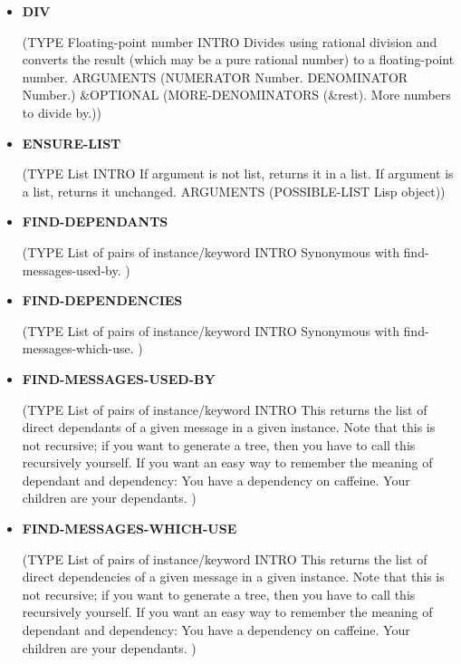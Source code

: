 \documentclass [11pt]{book}
\begin{document}
\begin{itemize}
\item {}
\label{prim:div}
\textbf{DIV}

(TYPE Floating-point number INTRO  Divides using rational division and converts the result (which may be a pure rational number)
to a floating-point number.
 ARGUMENTS (NUMERATOR Number. DENOMINATOR Number.) \&OPTIONAL (MORE-DENOMINATORS (\&rest). More numbers to divide by.))



\item {}
\label{prim:ensure-list}
\textbf{ENSURE-LIST}

(TYPE List INTRO  If argument is not list, returns it in a list. If argument is
a list, returns it unchanged.
 ARGUMENTS (POSSIBLE-LIST Lisp object))



\item {}
\label{prim:find-dependants}
\textbf{FIND-DEPENDANTS}

(TYPE List of pairs of instance/keyword INTRO  Synonymous with find-messages-used-by.
)



\item {}
\label{prim:find-dependencies}
\textbf{FIND-DEPENDENCIES}

(TYPE List of pairs of instance/keyword INTRO  Synonymous with find-messages-which-use.
)



\item {}
\label{prim:find-messages-used-by}
\textbf{FIND-MESSAGES-USED-BY}

(TYPE List of pairs of instance/keyword INTRO  This returns the list of direct dependants of a given
message in a given instance. Note that this is not recursive; if you want to generate a tree,
then you have to call this recursively yourself.
If you want an easy way to remember the meaning of dependant and dependency:
You have a dependency on caffeine. Your children are your dependants.
)



\item {}
\label{prim:find-messages-which-use}
\textbf{FIND-MESSAGES-WHICH-USE}

(TYPE List of pairs of instance/keyword INTRO  This returns the list of direct dependencies of a given
message in a given instance. Note that this is not recursive; if you want to generate a tree,
then you have to call this recursively yourself.
If you want an easy way to remember the meaning of dependant and dependency:
You have a dependency on caffeine. Your children are your dependants.
)




\end{itemize}
\end{document}
